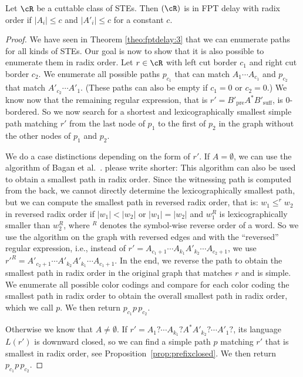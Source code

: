 \documentclass[a4paper,english]{lipics-v2016}
\theoremstyle{plain}
\newcommand{\tina}[1]{#1}
\begin{document}
 \begin{lemma} 
 Let $\cR$ be a cuttable class of STEs. Then \enumnodespaths$(\cR)$ is in FPT delay with radix order if $|A_i|\leq c$ and $|A'_i|\leq c$ for a constant $c$.\label{lemma:0crit-shortest}
 \end{lemma}
 \begin{proof}
 We have seen in Theorem \ref{theo:fptdelay:3} that we can enumerate paths for all kinds of STEs. Our goal is now to show that it is also possible to enumerate them in radix order. 
 Let $r \in \cR$ with left cut border $c_1$ and right cut border $c_2$.
 We enumerate all possible paths $p_{c_1}$ that can match $A_1 \cdots A_{c_1}$ and $p_{c_2}$ that match $A'_{c_2} \cdots A'_{1}$. (These paths can also be empty if $c_1 = 0$ or $c_2 = 0$.)
 We know now that the remaining regular expression, that is $r' = B'_\text{pre} A^* B'_\text{suff}$, is 0-bordered. So we now search for a shortest and lexicographically smallest simple path matching $r'$ from the last node of $p_1$ to the first of $p_2$ in the graph without the other nodes of $p_1$ and $p_2$.
 
 We do a case distinctions depending on the form of $r'$.
 If $A = \emptyset$, we can use the algorithm of Bagan et
 al.~\cite[Theorem 6]{bagan}. 
 \tina{please write shorter:}
 This algorithm can also be used to obtain a smallest path in radix order. Since the witnessing path is computed from the back, we cannot directly determine the lexicographically smallest path, but we can compute the smallest path in reversed radix order, that is: $w_1 \leq^r w_2$ in reversed radix order if $|w_1| < |w_2|$ or $|w_1| = |w_2|$ and $w_1^R$ is lexicographically smaller than $w_2^R$, where $^R$ denotes the symbol-wise reverse order of a word. 
 So we use the algorithm on the graph with reversed edges and with the ``reversed'' regular expression, i.e., instead of $r' = A_{c_1+1} \cdots A_{k_1}  A'_{k_2} \cdots A_{c_2+1}$, we use $r'^R = A'_{c_2+1} \cdots A'_{k_2}  A'_{k_1} \cdots A_{c_1+1}$. In the end, we reverse the path to obtain the smallest path in radix order in the original graph that matches $r$ and is simple.
 We enumerate all possible color codings and compare for each color coding the smallest path in radix order to obtain the overall smallest path in radix order, which we call $p$.
 We then return $p_{c_1} p\, p_{c_2}$.
 
 Otherwise we know that $A \neq \emptyset$. If $r' = A_{1}? \cdots A_{k_1}? A^* A'_{k_2}? \cdots A'_{1}?$, its language $L(r')$ is downward closed, so we can find a simple path $p$ matching $r'$ that is smallest in radix order, see Proposition~\ref{prop:prefixclosed}. We then return $p_{c_1}p\, p_{c_2}$.
 

\end{proof}
\end{document}
